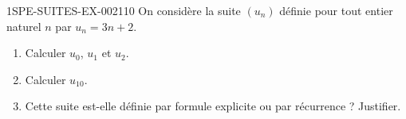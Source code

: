 \begin{exercice}{1SPE-SUITES-EX-002}{1}{10}
On considère la suite $(u_n)$ définie pour tout entier naturel $n$ par
$u_n = 3n + 2$.
\begin{enumerate}
  \item Calculer $u_0$, $u_1$ et $u_2$.
  \item Calculer $u_{10}$.
  \item Cette suite est-elle définie par formule explicite ou par récurrence ? Justifier.
\end{enumerate}
\end{exercice}
